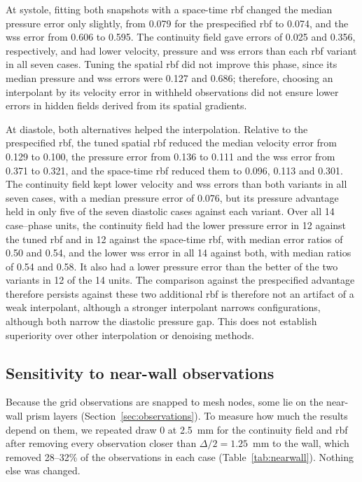 \documentclass[12pt,a4paper]{article}
\newcommand{\WSS}{\ac{wss}\xspace}
\newcommand{\RBF}{\ac{rbf}\xspace}
\theoremstyle{definition}
\numberwithin{equation}{section}
\providecommand{\DIFaddtex}[1]{{\protect\color{blue} \sf #1}} %
\providecommand{\DIFdeltex}[1]{{\protect\color{red} \scriptsize #1}} %
\providecommand{\DIFaddbegin}{} %
\providecommand{\DIFaddend}{} %
\providecommand{\DIFdelbegin}{} %
\providecommand{\DIFdelend}{} %
\providecommand{\DIFadd}[1]{\texorpdfstring{\DIFaddtex{#1}}{#1}} %
\providecommand{\DIFdel}[1]{\texorpdfstring{\DIFdeltex{#1}}{}} %
\newcommand{\DIFscaledelfig}{0.5}
\newlength{\DIFdelgraphicswidth} %
\newlength{\DIFdelgraphicsheight} %
\newcommand{\DIFaddincludegraphics}[2][]{{\color{blue}\fbox{\DIFOincludegraphics[#1]{#2}}}} %
\newcommand{\DIFdelincludegraphics}[2][]{%
\sbox{\DIFdelgraphicsbox}{\DIFOincludegraphics[#1]{#2}}%
\settoboxwidth{\DIFdelgraphicswidth}{\DIFdelgraphicsbox} %
\settoboxtotalheight{\DIFdelgraphicsheight}{\DIFdelgraphicsbox} %
\scalebox{\DIFscaledelfig}{%
\parbox[b]{\DIFdelgraphicswidth}{\usebox{\DIFdelgraphicsbox}\\[-\baselineskip] \rule{\DIFdelgraphicswidth}{0em}}\llap{\resizebox{\DIFdelgraphicswidth}{\DIFdelgraphicsheight}{%
\setlength{\unitlength}{\DIFdelgraphicswidth}%
\begin{picture}(1,1)%
\thicklines\linethickness{2pt} %
{\color[rgb]{1,0,0}\put(0,0){\framebox(1,1){}}}%
{\color[rgb]{1,0,0}\put(0,0){\line( 1,1){1}}}%
{\color[rgb]{1,0,0}\put(0,1){\line(1,-1){1}}}%
\end{picture}%
}\hspace*{3pt}}} %
} %
\DeclareRobustCommand{\DIFaddbegin}{\DIFOaddbegin \let\includegraphics\DIFaddincludegraphics} %
\DeclareRobustCommand{\DIFaddend}{\DIFOaddend \let\includegraphics\DIFOincludegraphics} %
\DeclareRobustCommand{\DIFdelbegin}{\DIFOdelbegin \let\includegraphics\DIFdelincludegraphics} %
\DeclareRobustCommand{\DIFdelend}{\DIFOaddend \let\includegraphics\DIFOincludegraphics} %
\begin{document}
At systole, fitting both snapshots with a space-time \RBF changed the median pressure error only slightly, from 0.079 for the prespecified \RBF to 0.074, and the \WSS error from 0.606 to 0.595. The continuity field gave errors of 0.025 and 0.356, respectively, and had lower velocity, pressure and \WSS errors than each \RBF variant in all seven cases. Tuning the spatial \RBF did not improve this phase, since its median pressure and \WSS errors were 0.127 and 0.686; therefore, choosing an interpolant by its velocity error in withheld observations did not ensure lower errors in hidden fields derived from its spatial gradients.

At diastole, both alternatives helped the interpolation. Relative to the prespecified \RBF, the tuned spatial \RBF reduced the median velocity error from 0.129 to 0.100, the pressure error from 0.136 to 0.111 and the \WSS error from 0.371 to 0.321, and the space-time \RBF reduced them to 0.096, 0.113 and 0.301. The continuity field kept lower velocity and \WSS errors than both variants in all seven cases, with a median pressure error of 0.076, but its pressure advantage held in only five of the seven diastolic cases against each variant. Over all 14 case--phase units, the continuity field had the lower pressure error in 12 against the tuned \RBF and in 12 against the space-time \RBF, with median error ratios of 0.50 and 0.54, and the lower \WSS error in all 14 against both, with median ratios of 0.54 and 0.58. It also had a lower pressure error than the better of the two variants in 12 of the 14 units. The \DIFdelbegin \DIFdel{comparison against the prespecified }\DIFdelend \DIFaddbegin \DIFadd{advantage therefore persists against these two additional }\DIFaddend \RBF \DIFdelbegin \DIFdel{is therefore not an artifact of a weak interpolant, although a stronger interpolant narrows }\DIFdelend \DIFaddbegin \DIFadd{configurations, although both narrow }\DIFaddend the diastolic pressure gap. \DIFaddbegin \DIFadd{This does not establish superiority over other interpolation or denoising methods.
}\DIFaddend 




\subsection{Sensitivity to near-wall observations}
\label{sec:nearwall}
Because the grid observations are snapped to mesh nodes, some lie on the near-wall prism layers (Section~\ref{sec:observations}). To measure how much the results depend on them, we repeated draw 0 at 2.5~mm for the continuity field and \RBF after removing every observation closer than $\Delta/2=1.25$~mm to the wall, which removed 28--32\% of the observations in each case (Table~\ref{tab:nearwall}). Nothing else was changed.
\end{document}
